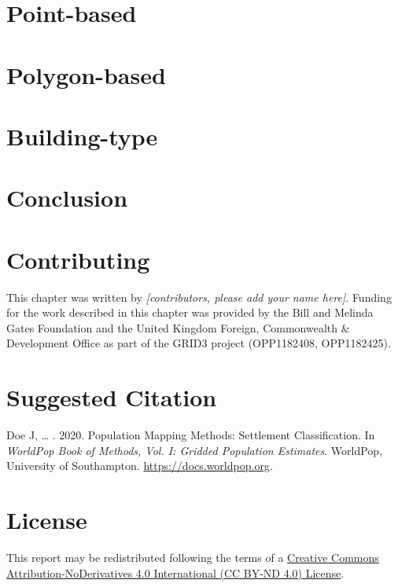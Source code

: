 \documentclass[]{book}
\begin{document}
\section{Point-based}\label{point-based}

\section{Polygon-based}\label{polygon-based}

\section{Building-type}\label{building-type}

\section{Conclusion}\label{conclusion-2}

\section*{Contributing}\label{contributing-4}

This chapter was written by \emph{{[}contributors, please add your name
here{]}}. Funding for the work described in this chapter was provided by
the Bill and Melinda Gates Foundation and the United Kingdom Foreign,
Commonwealth \& Development Office as part of the GRID3 project
(OPP1182408, OPP1182425).

\section*{Suggested Citation}\label{suggested-citation-4}

Doe J, \ldots{} . 2020. Population Mapping Methods: Settlement
Classification. In \emph{WorldPop Book of Methods, Vol. I: Gridded
Population Estimates}. WorldPop, University of Southampton.
\url{https://docs.worldpop.org}.

\section*{License}\label{license-2}

This report may be redistributed following the terms of a
\href{https://creativecommons.org/licenses/by-nd/4.0/}{Creative Commons
Attribution-NoDerivatives 4.0 International (CC BY-ND 4.0) License}.
\end{document}
